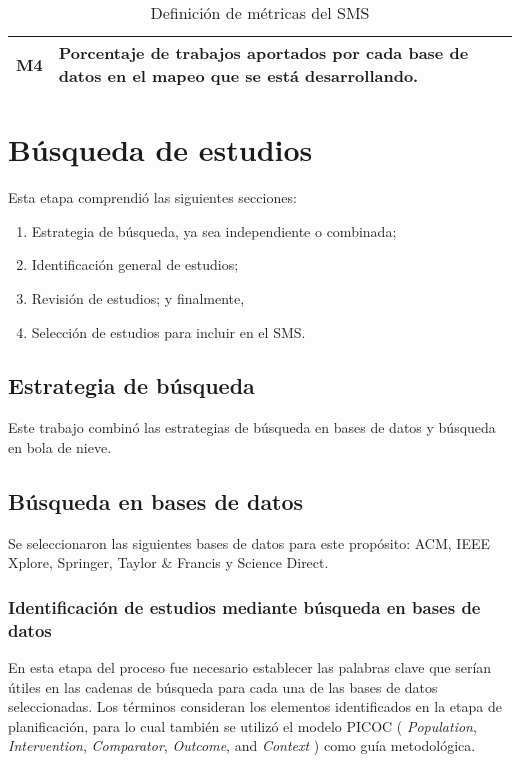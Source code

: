 \begin{table}[H]
\begin{tabular}{|c|p{13cm}|}
		M4               & Porcentaje de trabajos aportados por cada base de datos en el mapeo que se está desarrollando.                                                                                                                                                                                                                                                                                                                                                                                                                 \\ \hline
	\end{tabular}
	\caption{Definición de métricas del SMS}
	\label{tab:metricas}
\end{table}

\section{Búsqueda de estudios}

Esta etapa comprendió las siguientes secciones:
\begin{enumerate}
	\item Estrategia de búsqueda, ya sea independiente o combinada;
	\item Identificación general de estudios;
	\item Revisión de estudios; y finalmente,
	\item Selección de estudios para incluir en el SMS.\@
\end{enumerate}

\subsection{Estrategia de búsqueda}

Este trabajo combinó las estrategias de búsqueda en bases de datos y búsqueda en bola de nieve.

\subsection{Búsqueda en bases de datos}\label{subsec:busquedaBasesDatos}
Se seleccionaron las siguientes bases de datos para este propósito: ACM, IEEE Xplore, Springer, Taylor \& Francis y Science Direct.

\subsubsection{Identificación de estudios mediante búsqueda en bases de datos}\label{subsubsec:identificacionEstudios}
En esta etapa del proceso fue necesario establecer las palabras clave que serían útiles en las cadenas de búsqueda para cada una de las bases de datos seleccionadas.
Los términos consideran los elementos identificados en la etapa de planificación, para lo cual también se utilizó el modelo PICOC ( \textit{Population}, \textit{Intervention}, \textit{Comparator}, \textit{Outcome}, and \textit{Context} ) como guía metodológica.

